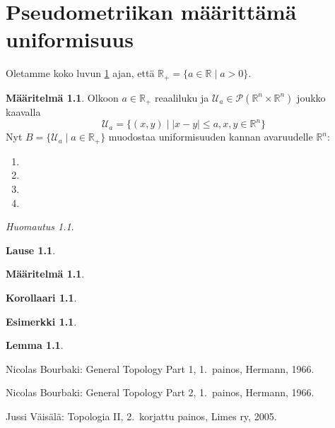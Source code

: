 \documentclass[12pt,a4paper,leqno]{report}
\newcommand{\R}{\mathbb{R}}
\newcommand{\U}{\mathcal{U}}
\newcommand{\Pot}{\mathcal{P}}
\theoremstyle{plain}
\newtheorem{lause}[equation]{Lause}
\newtheorem{lem}[equation]{Lemma}
\newtheorem{kor}[equation]{Korollaari}
\theoremstyle{definition}
\newtheorem{maar}[equation]{Määritelmä}
\newtheorem{esim}[equation]{Esimerkki}
\theoremstyle{remark}
\newtheorem{huom}[equation]{Huomautus}
\begin{document}
\chapter{Pseudometriikan määrittämä uniformisuus}\label{pseudo_uniformi}
Oletamme koko luvun \ref{pseudo_uniformi} ajan, että $\R_+=\{a\in\R\mid a>0\}$.
\begin{maar}
Olkoon $a\in\R_+$ reaaliluku ja $ \U_a\in\Pot( \R^n\times\R^n)$ joukko kaavalla
$$\U_a=\{ (x,y)\mid |x-y|\leq a,x,y\in\R^n\}$$
Nyt $B=\{\U_a\mid a\in\R_+\}$ muodostaa uniformisuuden kannan avaruudelle $\R^n$:
\begin{enumerate} [label=(B\arabic*)]
\item %
\item%
\item%
\item%
\end{enumerate}
\end{maar}

\begin{huom}
\end{huom}
\begin{lause}
\end{lause}
\begin{maar}
\end{maar}
\begin{kor}
\end{kor}
\begin{esim}
\end{esim}
\begin{lem}
\end{lem}
\begin{thebibliography}{9}

Nicolas Bourbaki: General Topology Part 1, 1.\ painos, Hermann, 1966.

Nicolas Bourbaki: General Topology Part 2, 1.\ painos, Hermann, 1966.

%
%
Jussi Väisälä: Topologia II, 2.\ korjattu painos, Limes ry, 2005.



\end{thebibliography}
\end{document}
